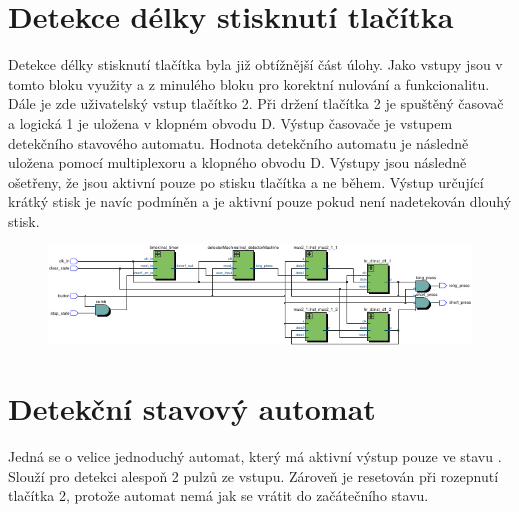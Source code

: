 \documentclass[FM,ZP]{tulthesis}
\begin{document}
	\section{Detekce délky stisknutí tlačítka}
	Detekce délky stisknutí tlačítka byla již obtížnější část úlohy. Jako vstupy jsou v tomto bloku využity  a  z minulého bloku pro korektní nulování a funkcionalitu. Dále je zde uživatelský vstup tlačítko 2. Při držení tlačítka 2 je spuštěný časovač a logická 1 je uložena v klopném obvodu D. Výstup časovače je vstupem detekčního stavového automatu. Hodnota detekčního automatu je následně uložena pomocí multiplexoru a klopného obvodu D. Výstupy jsou následně ošetřeny, že jsou aktivní pouze po stisku tlačítka a ne během. Výstup určující krátký stisk je navíc podmíněn a je aktivní pouze pokud není nadetekován dlouhý stisk.
	
	\begin{figure}[h]
		\centering
		\includegraphics[clip,width=1\textwidth]{hold_detector.pdf}
	\end{figure}

	\section{Detekční stavový automat}
	Jedná se o velice jednoduchý automat, který má aktivní výstup pouze ve stavu . Slouží pro detekci alespoň 2 pulzů ze vstupu. Zároveň je resetován při rozepnutí tlačítka 2, protože automat nemá jak se vrátit do začátečního stavu.
\end{document}
